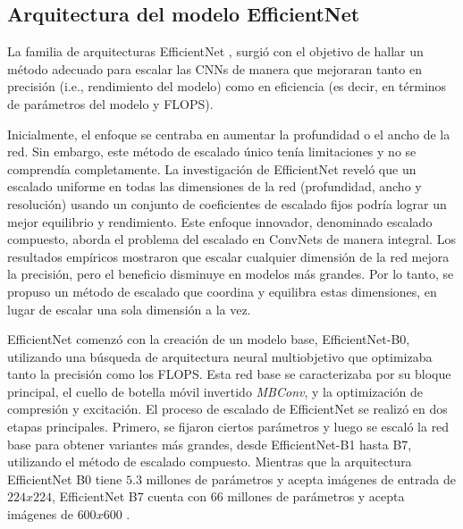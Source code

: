 \subsection{Arquitectura del modelo EfficientNet}
   
La familia de arquitecturas EfficientNet , surgió con el objetivo de hallar un método adecuado para escalar las CNNs de manera que mejoraran tanto en precisión (i.e., rendimiento del modelo) como en eficiencia (es decir, en términos de parámetros del modelo y FLOPS). 

Inicialmente, el enfoque se centraba en aumentar la profundidad o el ancho de la red. Sin embargo, este método de escalado único tenía limitaciones y no se comprendía completamente. La investigación de EfficientNet reveló que un escalado uniforme en todas las dimensiones de la red (profundidad, ancho y resolución) usando un conjunto de coeficientes de escalado fijos podría lograr un mejor equilibrio y rendimiento. Este enfoque innovador, denominado escalado compuesto, aborda el problema del escalado en ConvNets de manera integral. Los resultados empíricos mostraron que escalar cualquier dimensión de la red mejora la precisión, pero el beneficio disminuye en modelos más grandes. Por lo tanto, se propuso un método de escalado que coordina y equilibra estas dimensiones, en lugar de escalar una sola dimensión a la vez.

EfficientNet comenzó con la creación de un modelo base, EfficientNet-B0, utilizando una búsqueda de arquitectura neural multiobjetivo que optimizaba tanto la precisión como los FLOPS. Esta red base se caracterizaba por su bloque principal, el cuello de botella móvil invertido \textit{MBConv}, y la optimización de compresión y excitación. El proceso de escalado de EfficientNet se realizó en dos etapas principales. Primero, se fijaron ciertos parámetros y luego se escaló la red base para obtener variantes más grandes, desde EfficientNet-B1 hasta B7, utilizando el método de escalado compuesto. Mientras que la arquitectura EfficientNet B0 tiene $5.3$ millones de parámetros y acepta imágenes de entrada de $224x224$, EfficientNet B7 cuenta con $66$ millones de parámetros y acepta imágenes de $600x600$ .
  
